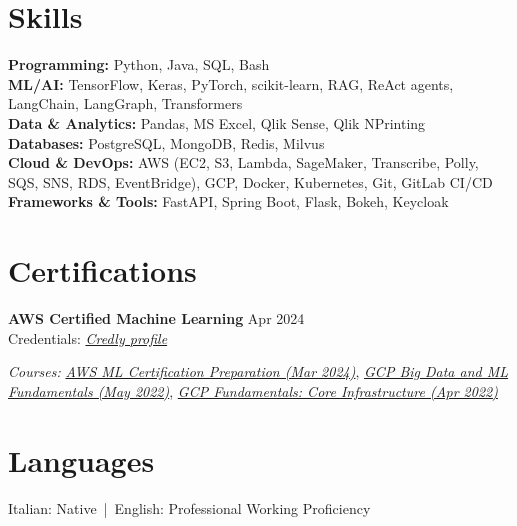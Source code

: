 \documentclass[11pt,a4paper]{article}
\let\OldHref\href
\renewcommand{\href}[2]{\OldHref{#1}{\textit{#2}}}
\begin{document}
	\section*{Skills}
	{\small
		\textbf{Programming:} Python, Java, SQL, Bash \\
		\textbf{ML/AI:} TensorFlow, Keras, PyTorch, scikit-learn, RAG, ReAct agents, LangChain, LangGraph, Transformers \\
		\textbf{Data \& Analytics:} Pandas, MS Excel, Qlik Sense, Qlik NPrinting \\
		\textbf{Databases:} PostgreSQL, MongoDB, Redis, Milvus \\
		\textbf{Cloud \& DevOps:} AWS (EC2, S3, Lambda, SageMaker, Transcribe, Polly, SQS, SNS, RDS, EventBridge), GCP, Docker, Kubernetes, Git, GitLab CI/CD \\
		\textbf{Frameworks \& Tools:} FastAPI, Spring Boot, Flask, Bokeh, Keycloak
	}
	
	\section*{Certifications}
	{\small
		\textbf{AWS Certified Machine Learning} \hfill Apr 2024 \\
		Credentials: \href{https://www.credly.com/badges/ab41e8bd-32a3-49ce-a7a5-e3106f58beab/public_url}{Credly profile}
		
		\textit{Courses: }%
		\href{https://certificates.cloudacademy.com/8997053f1d2091596d528402607d41ca312060fc.pdf}{AWS ML Certification Preparation (Mar 2024)}, %
		\href{https://www.coursera.org/account/accomplishments/verify/KFC43YVQX5ZS}{GCP Big Data and ML Fundamentals (May 2022)}, %
		\href{https://www.coursera.org/account/accomplishments/verify/GCCEPUHES7UC}{GCP Fundamentals: Core Infrastructure (Apr 2022)}
	}
	
	\section*{Languages}
	Italian: Native \,|\, English: Professional Working Proficiency
	
\end{document}
